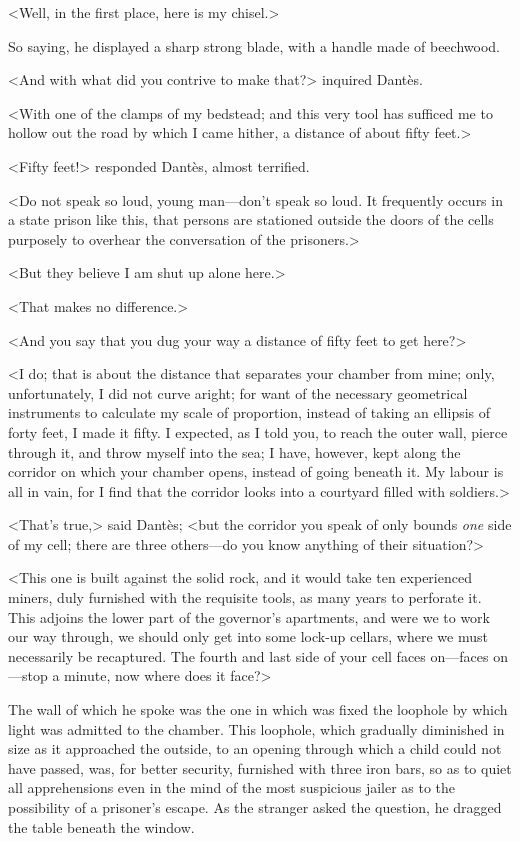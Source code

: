  <Well, in the first place, here is my chisel.> 

 So saying, he displayed a sharp strong blade, with a handle made of beechwood. 

 <And with what did you contrive to make that?> inquired Dantès. 

 <With one of the clamps of my bedstead; and this very tool has sufficed me to hollow out the road by which I came hither, a distance of about fifty feet.> 

 <Fifty feet!> responded Dantès, almost terrified. 

 <Do not speak so loud, young man—don't speak so loud. It frequently occurs in a state prison like this, that persons are stationed outside the doors of the cells purposely to overhear the conversation of the prisoners.> 

 <But they believe I am shut up alone here.> 

 <That makes no difference.> 

 <And you say that you dug your way a distance of fifty feet to get here?> 

 <I do; that is about the distance that separates your chamber from mine; only, unfortunately, I did not curve aright; for want of the necessary geometrical instruments to calculate my scale of proportion, instead of taking an ellipsis of forty feet, I made it fifty. I expected, as I told you, to reach the outer wall, pierce through it, and throw myself into the sea; I have, however, kept along the corridor on which your chamber opens, instead of going beneath it. My labour is all in vain, for I find that the corridor looks into a courtyard filled with soldiers.> 

 <That's true,> said Dantès; <but the corridor you speak of only bounds \textit{one} side of my cell; there are three others—do you know anything of their situation?> 

 <This one is built against the solid rock, and it would take ten experienced miners, duly furnished with the requisite tools, as many years to perforate it. This adjoins the lower part of the governor's apartments, and were we to work our way through, we should only get into some lock-up cellars, where we must necessarily be recaptured. The fourth and last side of your cell faces on—faces on—stop a minute, now where does it face?> 

 The wall of which he spoke was the one in which was fixed the loophole by which light was admitted to the chamber. This loophole, which gradually diminished in size as it approached the outside, to an opening through which a child could not have passed, was, for better security, furnished with three iron bars, so as to quiet all apprehensions even in the mind of the most suspicious jailer as to the possibility of a prisoner's escape. As the stranger asked the question, he dragged the table beneath the window. 

